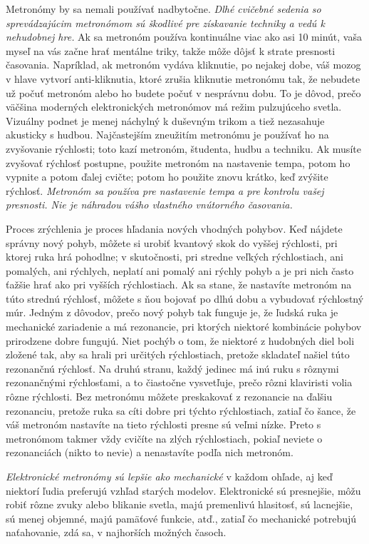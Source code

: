 Metronómy by sa nemali používať nadbytočne. \emph{Dlhé cvičebné sedenia so sprevádzajúcim metronómom sú škodlivé pre získavanie techniky a vedú k nehudobnej hre.} Ak sa metronóm používa kontinuálne viac ako asi 10 minút, vaša myseľ na vás začne hrať mentálne triky, takže môže dôjsť k strate presnosti časovania. Napríklad, ak metronóm vydáva kliknutie, po nejakej dobe, váš mozog v hlave vytvorí anti-kliknutia, ktoré zrušia kliknutie metronómu tak, že nebudete už počuť metronóm alebo ho budete počuť v nesprávnu dobu. To je dôvod, prečo väčšina moderných elektronických metronómov má režim pulzujúceho svetla. Vizuálny podnet je menej náchylný k duševným trikom a tiež nezasahuje akusticky s hudbou. Najčastejším zneužitím metronómu je používať ho na zvyšovanie rýchlosti; toto kazí metronóm, študenta, hudbu a techniku. Ak musíte zvyšovať rýchlosť postupne, použite metronóm na nastavenie tempa, potom ho vypnite a potom ďalej cvičte; potom ho použite znovu krátko, keď zvýšite rýchlosť. \emph{Metronóm sa používa pre nastavenie tempa a pre kontrolu vašej presnosti. Nie je náhradou vášho vlastného vnútorného časovania.}

Proces zrýchlenia je proces hľadania nových vhodných pohybov. Keď nájdete správny nový pohyb, môžete si urobiť kvantový skok do vyššej rýchlosti, pri ktorej ruka hrá pohodlne; v skutočnosti, pri stredne veľkých rýchlostiach, ani pomalých, ani rýchlych, neplatí ani pomalý ani rýchly pohyb a je pri nich často ťažšie hrať ako pri vyšších rýchlostiach. Ak sa stane, že nastavíte metronóm na túto strednú rýchlosť, môžete s ňou bojovať po dlhú dobu a vybudovať rýchlostný múr. Jedným z dôvodov, prečo nový pohyb tak funguje je, že ľudská ruka je mechanické zariadenie a má rezonancie, pri ktorých niektoré kombinácie pohybov prirodzene dobre fungujú. Niet pochýb o tom, že niektoré z  hudobných diel boli zložené tak, aby sa hrali pri určitých rýchlostiach, pretože skladateľ našiel túto rezonančnú rýchlosť. Na druhú stranu, každý jedinec má inú ruku s rôznymi rezonančnými rýchlosťami, a to čiastočne vysvetľuje, prečo rôzni klaviristi volia rôzne rýchlosti. Bez metronómu môžete preskakovať z rezonancie na ďalšiu rezonanciu, pretože ruka sa cíti dobre pri týchto rýchlostiach, zatiaľ čo šance, že váš metronóm nastavíte na tieto rýchlosti presne sú veľmi nízke. Preto s metronómom takmer vždy cvičíte na zlých rýchlostiach, pokiaľ neviete o rezonanciách (nikto to nevie) a nenastavíte podľa nich metronóm.

\emph{Elektronické metronómy sú lepšie ako mechanické} v každom ohľade, aj keď niektorí ľudia preferujú vzhľad starých modelov. Elektronické sú presnejšie, môžu robiť rôzne zvuky alebo blikanie  svetla, majú premenlivú hlasitosť, sú lacnejšie, sú menej objemné, majú pamäťové funkcie, atď., zatiaľ čo mechanické potrebujú naťahovanie, zdá sa, v najhorších možných časoch.

